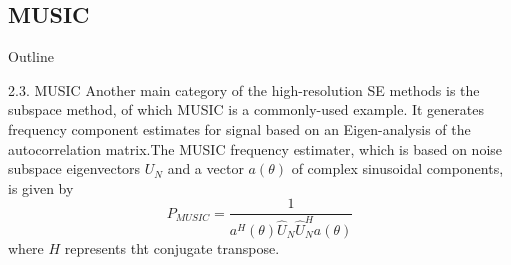 \documentclass[12pt]{beamer}
\begin{document}
\subsection{MUSIC}
\begin{frame}{Outline}
  \transfade%
  \tableofcontents[sectionstyle=show/shaded,subsectionstyle=show/shaded] %
\end{frame}
\begin{frame}{2.3. MUSIC}
  Another main category of the high-resolution SE
methods is the {\color{magenta} subspace method}, of which MUSIC
is a commonly-used example. It generates frequency component estimates for signal based on an Eigen-analysis of the autocorrelation matrix.The MUSIC frequency estimater, which is based on noise subspace eigenvectors $U_N$ and a vector $a(\theta)$ of complex sinusoidal components, is given by \begin{equation}
  P_{ {MUSIC }}=\frac{1}{a^{H}(\theta) \hat{U}_{N} \hat{U}_{N}^{H} a(\theta)}
\end{equation}
  where $H$ represents tht conjugate transpose.
\end{frame}
\end{document}
